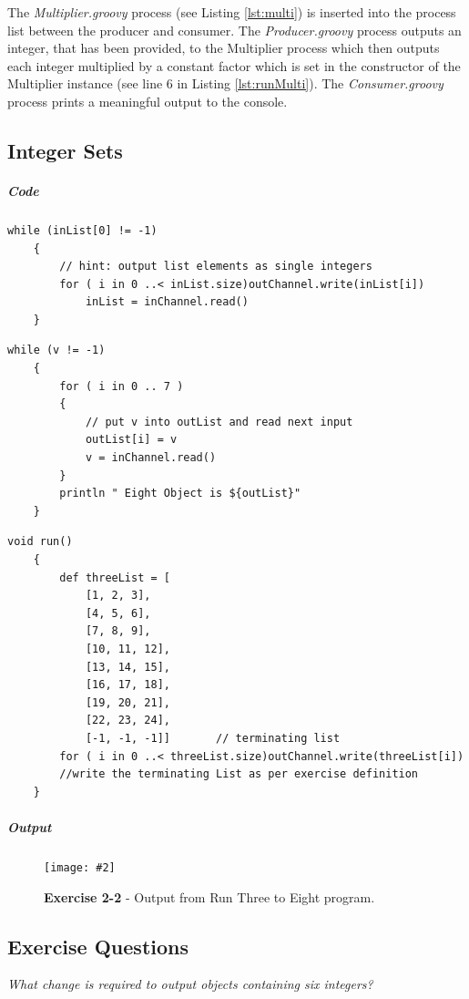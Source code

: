 \documentclass[10pt, a4paper]{article}
\newcommand{\figuremacro}[5]{
    \begin{figure}[#1]
        \centering
        \texttt{[image: \#2]}
        \caption[#3]{\textbf{#3}#4}
        \label{fig:#2}
    \end{figure}
}
\begin{document}
	The \textit{Multiplier.groovy} process (see Listing \ref{lst:multi}) is inserted into the process list between the producer and consumer. The \textit{Producer.groovy} process outputs an integer, that has been provided, to the Multiplier process which then outputs each integer multiplied by a constant factor which is set in the constructor of the Multiplier instance (see line 6 in Listing \ref{lst:runMulti}). The \textit{Consumer.groovy} process prints a meaningful output to the console. 
	\subsection{Integer Sets}
	
	\subparagraph{Code}
	\hfill

	\begin{lstlisting}[caption = "ListToStream.groovy"]
	while (inList[0] != -1)
	{
		// hint: output	list elements as single integers
		for ( i in 0 ..< inList.size)outChannel.write(inList[i])
			inList = inChannel.read()
	} 	\end{lstlisting}	
	
	\begin{lstlisting}[caption = "CreateSetsOfEight.groovy" \label{lst:328}]
	while (v != -1)
	{
		for ( i in 0 .. 7 )
		{
			// put v into outList and read next input
			outList[i] = v
			v = inChannel.read()
		}
		println " Eight Object is ${outList}"
	}	\end{lstlisting}
	
	\begin{lstlisting}[caption = "GenerateSetsOfThree.groovy"]
	void run()
	{
		def threeList = [
			[1, 2, 3], 
			[4, 5, 6], 
			[7, 8, 9], 
			[10, 11, 12], 
			[13, 14, 15], 
			[16, 17, 18],
			[19, 20, 21], 
			[22, 23, 24],
			[-1, -1, -1]]		// terminating list
		for ( i in 0 ..< threeList.size)outChannel.write(threeList[i])
		//write the terminating List as per exercise definition
	}	\end{lstlisting}
	
	\subparagraph{Output} \hfill
	
		
	\figuremacro{H}{2-2}{Exercise 2-2}{ - Output from Run Three to Eight program.}{0.6}
	
	\subsection*{Exercise Questions}
    \subitem	\textit{What change is required to output objects containing six integers?}
    
\end{document}
